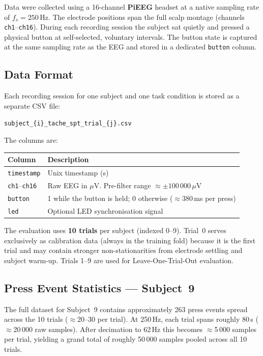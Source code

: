 \documentclass[12pt,a4paper]{article}
\begin{document}
Data were collected using a 16-channel \textbf{PiEEG} headset at a native
sampling rate of $f_s = 250$\,Hz. The electrode positions span the full
scalp montage (channels \texttt{ch1}--\texttt{ch16}). During each recording
session the subject sat quietly and pressed a physical button at
self-selected, voluntary intervals. The button state is captured at the
same sampling rate as the EEG and stored in a dedicated \texttt{button}
column.

\subsection{Data Format}

Each recording session for one subject and one task condition is stored as a
separate CSV file:

\begin{center}
\texttt{subject\_\{i\}\_tache\_spt\_trial\_\{j\}.csv}
\end{center}

The columns are:

\begin{center}
\begin{tabular}{lp{10cm}}
\toprule
Column & Description \\
\midrule
\texttt{timestamp} & Unix timestamp (s) \\
\texttt{ch1}--\texttt{ch16} & Raw EEG in $\mu$V. Pre-filter range $\approx \pm 100\,000\,\mu$V \\
\texttt{button} & 1 while the button is held; 0 otherwise ($\approx$380\,ms per press) \\
\texttt{led} & Optional LED synchronisation signal \\
\bottomrule
\end{tabular}
\end{center}

The evaluation uses \textbf{10 trials} per subject (indexed 0--9). Trial~0
serves exclusively as calibration data (always in the training fold) because
it is the first trial and may contain stronger non-stationarities from
electrode settling and subject warm-up. Trials 1--9 are used for
Leave-One-Trial-Out evaluation.

\subsection{Press Event Statistics — Subject~9}

The full dataset for Subject~9 contains approximately 263 press events
spread across the 10 trials ($\approx$20--30 per trial). At 250\,Hz, each
trial spans roughly 80\,s ($\approx$20\,000 raw samples). After decimation
to 62\,Hz this becomes $\approx$5\,000 samples per trial, yielding a grand
total of roughly 50\,000 samples pooled across all 10 trials.
\end{document}
